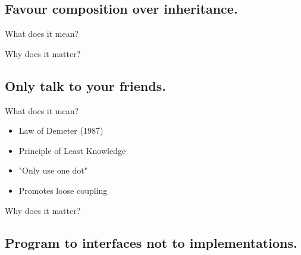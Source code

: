 \documentclass{beamer}
\begin{document}
\begin{frame}{}
    
\end{frame}

\subsection{Favour composition over inheritance.}

\begin{frame}{What does it mean?}
\end{frame}

\begin{frame}{Why does it matter?}
\end{frame}

\subsection{Only talk to your friends.}


\begin{frame}{What does it mean?}
    \begin{itemize}
        \item Law of Demeter (1987)
        \item Principle of Least Knowledge
        \item "Only use one dot"
        \item Promotes loose coupling
    \end{itemize}
\end{frame}

\begin{frame}{Why does it matter?}
\end{frame}

\begin{frame}{}
    
\end{frame}

\begin{frame}{}
    
\end{frame}

\subsection{Program to interfaces not to implementations.}
\end{document}
